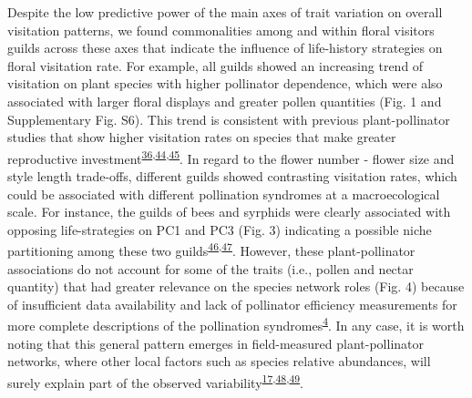 \documentclass[12pt,a4paper,]{article}
\begin{document}
Despite the low predictive power of the main axes of trait variation on
overall visitation patterns, we found commonalities among and within
floral visitors guilds across these axes that indicate the influence of
life-history strategies on floral visitation rate. For example, all
guilds showed an increasing trend of visitation on plant species with
higher pollinator dependence, which were also associated with larger
floral displays and greater pollen quantities (Fig. 1 and Supplementary
Fig. S6). This trend is consistent with previous plant-pollinator
studies that show higher visitation rates on species that make greater
reproductive
investment\textsuperscript{\protect\hyperlink{ref-lazaro2013}{36},\protect\hyperlink{ref-hegland2005}{44},\protect\hyperlink{ref-kaiser2014}{45}}.
In regard to the flower number - flower size and style length
trade-offs, different guilds showed contrasting visitation rates, which
could be associated with different pollination syndromes at a
macroecological scale. For instance, the guilds of bees and syrphids
were clearly associated with opposing life-strategies on PC1 and PC3
(Fig. 3) indicating a possible niche partitioning among these two
guilds\textsuperscript{\protect\hyperlink{ref-palmer2003}{46},\protect\hyperlink{ref-phillips2020}{47}}.
However, these plant-pollinator associations do not account for some of
the traits (i.e., pollen and nectar quantity) that had greater relevance
on the species network roles (Fig. 4) because of insufficient data
availability and lack of pollinator efficiency measurements for more
complete descriptions of the pollination
syndromes\textsuperscript{\protect\hyperlink{ref-dellinger2020}{4}}. In
any case, it is worth noting that this general pattern emerges in
field-measured plant-pollinator networks, where other local factors such
as species relative abundances, will surely explain part of the observed
variability\textsuperscript{\protect\hyperlink{ref-bartomeus2016}{17},\protect\hyperlink{ref-vazquez2007}{48},\protect\hyperlink{ref-encinas2012}{49}}.
\end{document}
